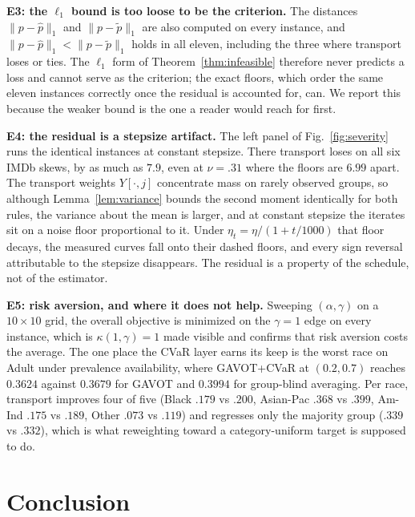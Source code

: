 \documentclass{article}
\theoremstyle{definition}
\newcommand{\avot}{\textsf{GAVOT}}
\newcommand{\avotcvar}{\textsf{GAVOT+CVaR}}
\begin{document}
\noindent\textbf{E3: the $\ell_1$ bound is too loose to be the criterion.}
The distances $\|p-\hat p\|_1$ and $\|p-\tilde p\|_1$ are also computed on every
instance, and $\|p-\hat p\|_1<\|p-\tilde p\|_1$ holds in all eleven, including
the three where transport loses or ties. The $\ell_1$ form of
Theorem~\ref{thm:infeasible} therefore never predicts a loss and cannot serve as
the criterion; the exact floors, which order the same eleven instances
correctly once the residual is accounted for, can. We report this because the
weaker bound is the one a reader would reach for first.

\noindent\textbf{E4: the residual is a stepsize artifact.}
The left panel of Fig.~\ref{fig:severity} runs the identical instances at
constant stepsize. There transport loses on all six IMDb skews, by as much as
$7.9$, even at $\nu{=}.31$ where the floors are $6.99$ apart. The transport
weights $Y[\cdot,j]$ concentrate mass on rarely observed groups, so although
Lemma~\ref{lem:variance} bounds the second moment identically for both rules,
the variance about the mean is larger, and at constant stepsize the iterates sit
on a noise floor proportional to it. Under $\eta_t=\eta/(1+t/1000)$ that floor
decays, the measured curves fall onto their dashed floors, and every sign
reversal attributable to the stepsize disappears. The residual is a property of
the schedule, not of the estimator.

\noindent\textbf{E5: risk aversion, and where it does not help.}
Sweeping $(\alpha,\gamma)$ on a $10\times10$ grid, the overall objective is
minimized on the $\gamma=1$ edge on every instance, which is
$\kappa(1,\gamma)=1$ made visible and confirms that risk aversion costs the
average. The one place the CVaR layer earns its keep is the worst race on Adult
under prevalence availability, where \avotcvar{} at $(0.2,0.7)$ reaches
$0.3624$ against $0.3679$ for \avot{} and $0.3994$ for group-blind averaging.
Per race, transport improves four of five (Black $.179$ vs $.200$, Asian-Pac
$.368$ vs $.399$, Am-Ind $.175$ vs $.189$, Other $.073$ vs $.119$) and regresses
only the majority group ($.339$ vs $.332$), which is what reweighting toward a
category-uniform target is supposed to do.

\section{Conclusion}
\end{document}
